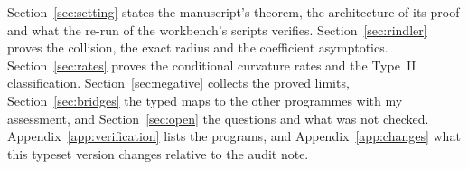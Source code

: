 Section~\ref{sec:setting} states the manuscript's theorem, the architecture of its proof and what the re-run of the workbench's scripts verifies. Section~\ref{sec:rindler} proves the collision, the exact radius and the coefficient asymptotics. Section~\ref{sec:rates} proves the conditional curvature rates and the Type~II classification. Section~\ref{sec:negative} collects the proved limits, Section~\ref{sec:bridges} the typed maps to the other programmes with my assessment, and Section~\ref{sec:open} the questions and what was not checked. Appendix~\ref{app:verification} lists the programs, and Appendix~\ref{app:changes} what this typeset version changes relative to the audit note.
